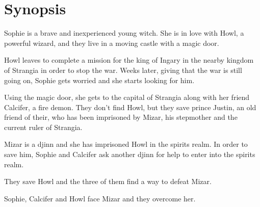 \section{Synopsis}

Sophie is a brave and inexperienced young witch. She is in love with Howl, a powerful wizard, and they live in a moving castle with a magic door.

Howl leaves to complete a mission for the king of Ingary in the nearby kingdom of Strangia in order to stop the war. Weeks later, giving that the war is still going on, Sophie gets worried and she starts looking for him.

Using the magic door, she gets to the capital of Strangia along with her friend Calcifer, a fire demon. They don’t find Howl, but they save prince Justin, an old friend of their, who has been imprisoned by Mizar, his stepmother and the current ruler of Strangia.

Mizar is a djinn and she has imprisoned Howl in the spirits realm. In order to save him, Sophie and Calcifer ask another djinn for help to enter into the spirits realm.

They save Howl and the three of them find a way to defeat Mizar.

Sophie, Calcifer and Howl face Mizar and they overcome her.
